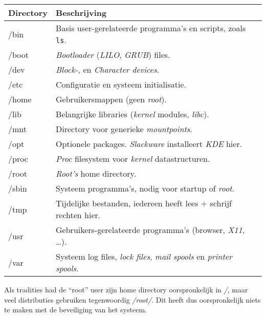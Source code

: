 \begin{tabular}[t]{ll}
  \hline
  Directory & Beschrijving\\
  \hline
  /bin & Basis user-gerelateerde programma's en scripts, zoals \texttt{ls}\index{ls}.\\
  /boot & \emph{Bootloader} (\emph{LILO}, \emph{GRUB}) files.\\
  /dev & \emph{Block-,} en \emph{Character devices}.\\
  /etc & Configuratie en systeem initialisatie.\\
  /home & Gebruikersmappen (geen \emph{root}).\\
  /lib & Belangrijke libraries (\emph{kernel} modules, \emph{libc}).\\
  /mnt & Directory voor generieke \emph{mountpoints}.\\
  /opt & Optionele packages. \emph{Slackware} installeert \emph{KDE} hier.\\
  /proc & \emph{Proc} filesystem voor \emph{kernel} datastructuren.\\
  /root & \emph{Root's} home directory.\\
  /sbin & Systeem programma's, nodig voor startup of \emph{root}.\\
  /tmp & Tijdelijke bestanden, iedereen heeft lees + schrijf rechten hier.\\
  /usr & Gebruikers-gerelateerde programma's (browser, \emph{X11}, \ldots).\\
  /var & Systeem log files, \emph{lock files}, \emph{mail spools} en \emph{printer spools}.\\
\end{tabular}

Als tradities had de ``root'' user zijn home directory oorspronkelijk in \emph{/}, maar veel distributies gebruiken tegenwoordig \emph{/root/}\cite{bib.root}. Dit heeft dus oorspronkelijk niets te maken met de beveiliging van het systeem.
